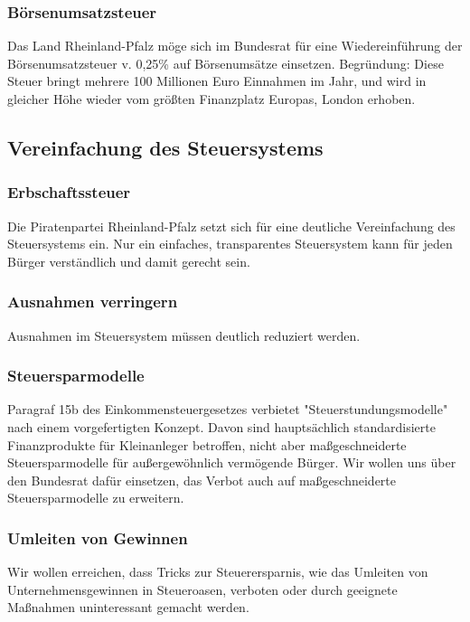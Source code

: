 \subsubsection{Börsenumsatzsteuer}
\abstimmung
Das Land Rheinland-Pfalz möge sich im Bundesrat für eine Wiedereinführung der Börsenumsatzsteuer v. 0,25\% auf Börsenumsätze einsetzen. Begründung: Diese Steuer bringt mehrere 100 Millionen Euro Einnahmen im Jahr, und wird in gleicher Höhe wieder vom größten Finanzplatz Europas, London erhoben.
 
\subsection*{Vereinfachung des Steuersystems}

\subsubsection{Erbschaftssteuer}
\abstimmung
Die Piratenpartei Rheinland-Pfalz setzt sich für eine deutliche Vereinfachung des Steuersystems ein. Nur ein einfaches, transparentes Steuersystem kann für jeden Bürger verständlich und damit gerecht sein.

\subsubsection{Ausnahmen verringern}
\abstimmung
Ausnahmen im Steuersystem müssen deutlich reduziert werden.

\subsubsection{Steuersparmodelle}
\abstimmung
Paragraf 15b des Einkommensteuergesetzes verbietet "Steuerstundungsmodelle" nach einem vorgefertigten Konzept. Davon sind hauptsächlich standardisierte Finanzprodukte für Kleinanleger betroffen, nicht aber maßgeschneiderte Steuersparmodelle für außergewöhnlich vermögende Bürger. Wir wollen uns über den Bundesrat dafür einsetzen, das Verbot auch auf maßgeschneiderte Steuersparmodelle zu erweitern.

\subsubsection{Umleiten von Gewinnen}
\abstimmung
Wir wollen erreichen, dass Tricks zur Steuerersparnis, wie das Umleiten von Unternehmensgewinnen in Steueroasen, verboten oder durch geeignete Maßnahmen uninteressant gemacht werden.
 
